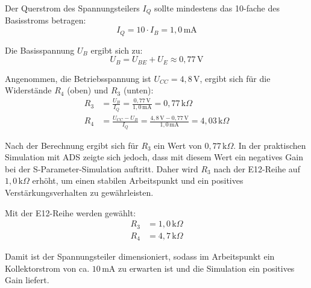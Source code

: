 Der Querstrom des Spannungsteilers $I_Q$ sollte mindestens das 10-fache des Basisstroms betragen:
\begin{equation}
    I_Q = 10 \cdot I_B = 1{,}0\,\mathrm{mA}
\end{equation}

Die Basisspannung $U_B$ ergibt sich zu:
\begin{equation}
    U_B = U_{BE} + U_E \approx 0{,}77\,\mathrm{V}
\end{equation}

Angenommen, die Betriebsspannung ist $U_{CC} = 4{,}8\,\mathrm{V}$, ergibt sich für die Widerstände $R_4$ (oben) und $R_3$ (unten):
\begin{align}
    R_3 &= \frac{U_B}{I_Q} = \frac{0{,}77\,\mathrm{V}}{1{,}0\,\mathrm{mA}} = 0{,}77\,\mathrm{k}\Omega \\
    R_4 &= \frac{U_{CC} - U_B}{I_Q} = \frac{4{,}8\,\mathrm{V} - 0{,}77\,\mathrm{V}}{1{,}0\,\mathrm{mA}} = 4{,}03\,\mathrm{k}\Omega
\end{align}

Nach der Berechnung ergibt sich für $R_3$ ein Wert von $0{,}77\,\mathrm{k}\Omega$. In der praktischen Simulation mit ADS zeigte sich jedoch, dass mit diesem Wert ein negatives Gain bei der S-Parameter-Simulation auftritt. Daher wird $R_3$ nach der E12-Reihe auf $1{,}0\,\mathrm{k}\Omega$ erhöht, um einen stabilen Arbeitspunkt und ein positives Verstärkungsverhalten zu gewährleisten.

Mit der E12-Reihe werden gewählt:
\begin{align*}
    R_3 &= 1{,}0\,\mathrm{k}\Omega \\
    R_4 &= 4{,}7\,\mathrm{k}\Omega
\end{align*}

Damit ist der Spannungsteiler dimensioniert, sodass im Arbeitspunkt ein Kollektorstrom von ca. $10\,\mathrm{mA}$ zu erwarten ist und die Simulation ein positives Gain liefert.

